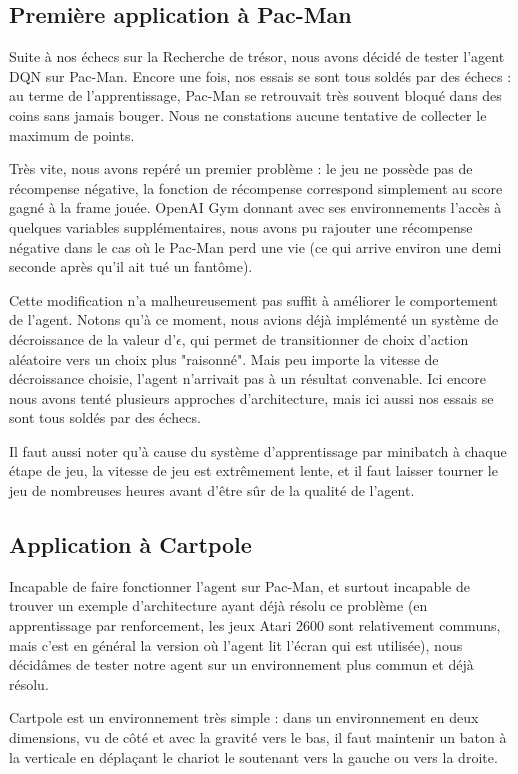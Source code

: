 \subsection{Première application à Pac-Man}
Suite à nos échecs sur la Recherche de trésor, nous avons décidé de tester l'agent DQN sur Pac-Man. Encore une fois, nos essais se sont tous soldés par des échecs : au terme de l'apprentissage, Pac-Man se retrouvait très souvent bloqué dans des coins sans jamais bouger. Nous ne constations aucune tentative de collecter le maximum de points.
\par
Très vite, nous avons repéré un premier problème : le jeu ne possède pas de récompense négative, la fonction de récompense correspond simplement au score gagné à la frame jouée. OpenAI Gym donnant avec ses environnements l'accès à quelques variables supplémentaires, nous avons pu rajouter une récompense négative dans le cas où le Pac-Man perd une vie (ce qui arrive environ une demi seconde après qu'il ait tué un fantôme).
\par
Cette modification n'a malheureusement pas suffit à améliorer le comportement de l'agent. Notons qu'à ce moment, nous avions déjà implémenté un système de décroissance de la valeur d'$\epsilon$, qui permet de transitionner de choix d'action aléatoire vers un choix plus "raisonné". Mais peu importe la vitesse de décroissance choisie, l'agent n'arrivait pas à un résultat convenable. Ici encore nous avons tenté plusieurs approches d'architecture, mais ici aussi nos essais se sont tous soldés par des échecs.
\par
Il faut aussi noter qu'à cause du système d'apprentissage par minibatch à chaque étape de jeu, la vitesse de jeu est extrêmement lente, et il faut laisser tourner le jeu de nombreuses heures avant d'être sûr de la qualité de l'agent.

\subsection{Application à Cartpole}
Incapable de faire fonctionner l'agent sur Pac-Man, et surtout incapable de trouver un exemple d'architecture ayant déjà résolu ce problème (en apprentissage par renforcement, les jeux Atari 2600 sont relativement communs, mais c'est en général la version où l'agent lit l'écran qui est utilisée), nous décidâmes de tester notre agent sur un environnement plus commun et déjà résolu.
\par
Cartpole est un environnement très simple : dans un environnement en deux dimensions, vu de côté et avec la gravité vers le bas, il faut maintenir un baton à la verticale en déplaçant le chariot le soutenant vers la gauche ou vers la droite.

